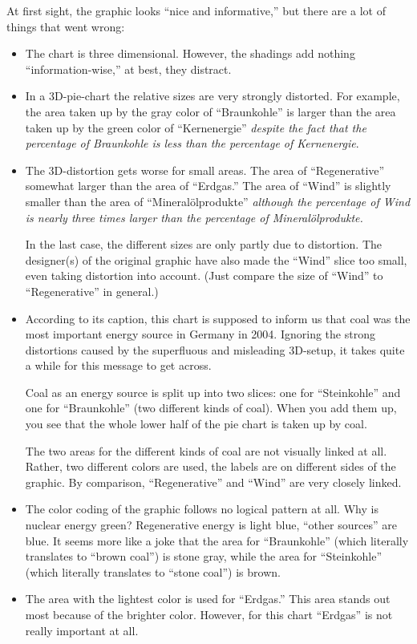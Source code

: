 At first sight, the graphic looks ``nice and informative,'' but there are a lot
of things that went wrong:
%
\begin{itemize}
    \item The chart is three dimensional. However, the shadings add nothing
        ``information-wise,'' at best, they distract.
    \item In a 3D-pie-chart the relative sizes are very strongly distorted.
        For example, the area taken up by the gray color of ``Braunkohle'' is
        larger than the area taken up by the green color of ``Kernenergie''
        \emph{despite the fact that the percentage of Braunkohle is less than
        the percentage of Kernenergie}.
    \item The 3D-distortion gets worse for small areas. The area of
        ``Regenerative'' somewhat larger  than the area of ``Erdgas.'' The
        area of ``Wind'' is slightly smaller than the area of
        ``Mineral\"olprodukte'' \emph{although the percentage of Wind is
        nearly three times larger than the percentage of
        Mineral\"olprodukte.}

        In the last case, the different sizes are only partly due to
        distortion. The designer(s) of the original graphic have also made
        the ``Wind'' slice too small, even taking distortion into
        account. (Just compare the size of ``Wind'' to ``Regenerative'' in
        general.)
    \item According to its caption, this chart is supposed to inform us that
        coal was the most important energy source in Germany in 2004.
        Ignoring the strong distortions caused by the superfluous and
        misleading 3D-setup, it takes quite a while for this message to get
        across.

        Coal as an energy source is split up into two slices: one for
        ``Steinkohle'' and one for ``Braunkohle'' (two different kinds of
        coal). When you add them up, you see that the whole lower half of
        the pie chart is taken up by coal.

        The two areas for the different kinds of coal are not visually
        linked at all. Rather, two different colors are used, the labels are
        on different sides of the graphic. By comparison, ``Regenerative''
        and ``Wind'' are very closely linked.
    \item The color coding of the graphic follows no logical pattern at all.
        Why is nuclear energy green? Regenerative energy is light blue,
        ``other sources'' are blue. It seems more like a joke that the area
        for ``Braunkohle'' (which literally translates to ``brown coal'') is
        stone gray, while the area for ``Steinkohle'' (which literally
        translates to ``stone coal'') is brown.
    \item The area with the lightest color is used for ``Erdgas.'' This area
        stands out most because of the brighter color. However, for this
        chart ``Erdgas'' is not really important at all.
\end{itemize}
